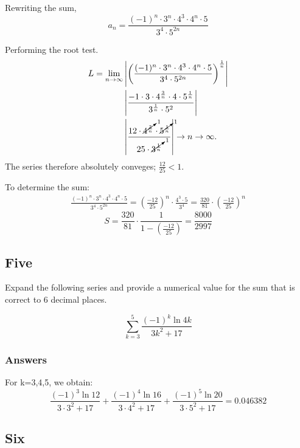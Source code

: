 \documentclass{article}
\begin{document}
Rewriting the sum,
\[
a_n = \frac{ (-1)^n \cdot 3^n \cdot 4^3 \cdot 4^n \cdot 5}{3^4 \cdot 5^{2n}}
\]

Performing the root test.
\begin{align*}
L = \lim_{n\to\infty} & \left| \left( \frac{(-1)^n \cdot 3^n \cdot 4^3 \cdot 4^n \cdot 5} {3^4 \cdot 5^{2n}}\right)^{\frac{1}{n}}\right| \\
& \left |\frac{-1 \cdot 3 \cdot 4^{\frac{3}{n}} \cdot 4 \cdot 5^{\frac{1}{n}}}{3^{\frac{1}{n}} \cdot 5^2} \right| \\
& \left | \frac {12 \cdot \cancelto{1}{4^{\frac{3}{n}}} \cdot \cancelto{1}{5^{\frac{1}{n}}}}{25 \cdot \cancelto{1}{3^{\frac{1}{n}}}} \right | \rightarrow n \to \infty.
\end{align*}
The series therefore absolutely conveges;  $\frac{12}{25} < 1$.

To determine the sum:
\begin{align*}
\frac{ (-1)^n \cdot 3^n \cdot 4^3 \cdot 4^n \cdot 5}{3^4 \cdot 5^{2n}}
= \left(\frac{-12}{25}\right)^n \cdot \frac{4^3 \cdot 5}{3^4} = \frac{320}{81} \cdot \left(\frac{-12}{25}\right)^n
\end{align*}
\[
S = \frac{320}{81} \cdot \frac{1}{1-\left(\frac{-12}{25}\right)} = \frac{8000}{2997}
\]

\par

\subsection*{Five}
Expand the following series and provide a numerical value for the sum that is correct to 6 decimal places.

\begin{equation}\label{a5}
\sum_{k=3}^{5} \frac{(-1)^k\ln{4k}}{3k^2+17}
\end{equation}

\subsubsection*{Answers}

For k=3,4,5, we obtain:
\[
\frac{(-1)^3\ln{12}}{3\cdot 3^2+17} + \frac{(-1)^4\ln{16}}{3\cdot 4^2+17} + \frac{(-1)^5\ln{20}}{3\cdot 5^2+17} = 0.046382
\]

\par

\subsection*{Six}
\end{document}
